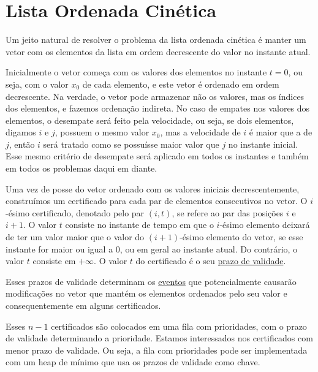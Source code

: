 

\section{Lista Ordenada Cinética}
\label{lista:secao}
Um jeito natural de resolver o problema da lista ordenada cinética é
manter um vetor com os elementos da lista em ordem decrescente do
valor no instante atual.

Inicialmente o vetor começa com os valores dos elementos no instante
$t = 0$, ou seja, com o valor $x_0$ de cada elemento, e este vetor é
ordenado em ordem decrescente. Na verdade, o vetor pode armazenar
não os valores, mas os índices dos elementos, e fazemos ordenação
indireta. No caso de empates nos valores dos elementos, o desempate
será feito pela velocidade, ou seja, se dois elementos, digamos $i$
e $j$, possuem o mesmo valor $x_0$, mas a velocidade de $i$ é maior
que a de $j$, então $i$ será tratado como se possuísse maior valor
que $j$ no instante inicial. Esse mesmo critério de desempate será
aplicado em todos os instantes e também em todos os problemas daqui
em diante.

Uma vez de posse do vetor ordenado com os valores iniciais
decrescentemente, construímos um certificado para cada par de
elementos consecutivos no vetor. O $i$-ésimo certificado, denotado
pelo par $(i, t)$, se refere ao par das posições $i$ e $i + 1$. O
valor $t$ consiste no instante de tempo em que o $i$-ésimo elemento
deixará de ter um valor maior que o valor do $(i + 1)$-ésimo
elemento do vetor, se esse instante for maior ou igual a 0, ou em
geral ao instante atual. Do contrário, o valor $t$ consiste em
$+\infty$. O valor $t$ do certificado é o seu \underline{prazo de
validade}.

Esses prazos de validade determinam os \underline{eventos} que
potencialmente causarão modificações no vetor que mantém os
elementos ordenados pelo seu valor e consequentemente em alguns
certificados.

Esses $n - 1$ certificados são colocados em uma fila com
prioridades, com o prazo de validade determinando a prioridade.
Estamos interessados nos certificados com menor prazo de validade.
Ou seja, a fila com prioridades pode ser implementada com um heap de
mínimo que usa os prazos de validade como chave.

